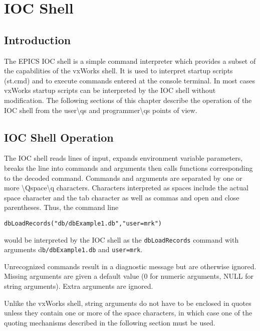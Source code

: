 





\chapter{IOC Shell}

\section{Introduction}

The EPICS IOC shell is a simple command interpreter which provides a subset of the capabilities of the vxWorks shell. It 
is used to interpret startup scripts (st.cmd) and to execute commands entered at the console terminal.  In most cases 
vxWorks startup scripts can be interpreted by the IOC shell without modification. The following sections of this chapter 
describe the operation of the IOC shell from the user\textbackslash{}qs and programmer\textbackslash{}qs points of view.

\section{IOC Shell Operation}

The IOC shell reads lines of input, expands environment variable parameters, breaks the line into commands and 
arguments then calls functions corresponding to the decoded command. Commands and arguments are separated by one 
or more \textbackslash{}Qspace\textbackslash{}q characters. Characters interpreted as spaces include the actual space character and the tab character as 
well as commas and open and close parentheses. Thus, the command line

\begin{verbatim}dbLoadRecords("db/dbExample1.db","user=mrk")
\end{verbatim}would be interpreted by the IOC shell as the \verb|dbLoadRecords| command with arguments d\verb|b/dbExample1.db| and 
\verb|user=mrk|.

Unrecognized commands result in a diagnostic message but are otherwise ignored.  Missing arguments are given a default 
value (0 for numeric arguments, NULL for string arguments).  Extra arguments are ignored.

Unlike the vxWorks shell, string arguments do not have to be enclosed in quotes unless they contain one or more of the 
space characters, in which case one of the quoting mechanisms described in the following section must be used.

